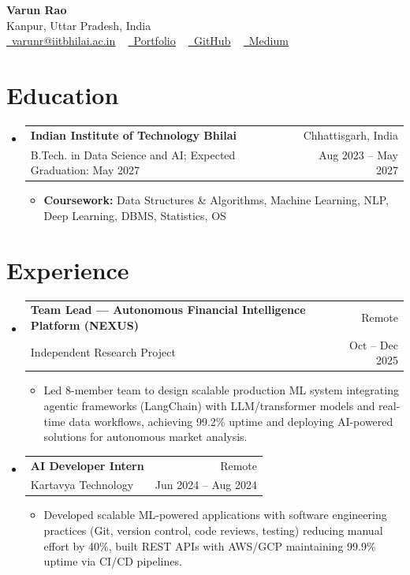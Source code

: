 \documentclass[letterpaper,11pt]{article}
\makeatletter
\newcommand{\resumeItem}[1]{\item {\small #1 \vspace{-3pt}}}
\newcommand{\resumeSubheading}[4]{
  \vspace{-3pt}\item
    \begin{tabular*}{0.97\textwidth}[t]{l@{\extracolsep{\fill}}r}
      \textbf{#1} & #2 \\
      {\small #3} & {\small #4} \\
    \end{tabular*}\vspace{-6pt}
}
\newcommand{\resumeSubHeadingListStart}{\begin{itemize}[leftmargin=0.15in, label={}]}
\newcommand{\resumeSubHeadingListEnd}{\end{itemize}}
\newcommand{\resumeItemListStart}{\begin{itemize}[leftmargin=0.25in]}
\newcommand{\resumeItemListEnd}{\end{itemize}\vspace{-5pt}}
\makeatother
\begin{document}
\begin{center}
  {\Huge \textbf{Varun Rao}} \\ \vspace{2pt}
  Kanpur, Uttar Pradesh, India \\ \vspace{1pt}
  \small
  \href{mailto:varunr@iitbhilai.ac.in}{\faEnvelope\ \underline{varunr@iitbhilai.ac.in}} ~
  \href{https://varun-rao.netlify.app/}{\faGlobe\ \underline{Portfolio}} ~
  \href{https://github.com/VARUN3WARE}{\faGithub\ \underline{GitHub}} ~
  \href{https://medium.com/@varunrao.aiml}{\faMedium\ \underline{Medium}}
\end{center}

\section{Education}
\resumeSubHeadingListStart
  \resumeSubheading
    {Indian Institute of Technology Bhilai}{Chhattisgarh, India}
    {B.Tech. in Data Science and AI; Expected Graduation: May 2027}{Aug 2023 -- May 2027}
    \resumeItemListStart
      \resumeItem{\textbf{Coursework:} Data Structures \& Algorithms, Machine Learning, NLP, Deep Learning, DBMS, Statistics, OS}
    \resumeItemListEnd
\resumeSubHeadingListEnd

\section{Experience}
\resumeSubHeadingListStart
  \resumeSubheading
    {Team Lead — Autonomous Financial Intelligence Platform (NEXUS)}{Remote}
    {Independent Research Project}{Oct -- Dec 2025}
    \resumeItemListStart
      \resumeItem{Led 8-member team to design scalable production ML system integrating agentic frameworks (LangChain) with LLM/transformer models and real-time data workflows, achieving 99.2\% uptime and deploying AI-powered solutions for autonomous market analysis.}
    \resumeItemListEnd

  \resumeSubheading
    {AI Developer Intern}{Remote}
    {Kartavya Technology}{Jun 2024 -- Aug 2024}
    \resumeItemListStart
      \resumeItem{Developed scalable ML-powered applications with software engineering practices (Git, version control, code reviews, testing) reducing manual effort by 40\%, built REST APIs with AWS/GCP maintaining 99.9\% uptime via CI/CD pipelines.}
    \resumeItemListEnd
\resumeSubHeadingListEnd
\end{document}
